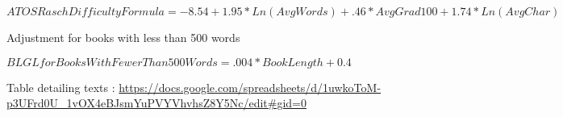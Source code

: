 $ATOS Rasch Difficulty Formula = -8.54 + 1.95 * Ln(AvgWords) + .46 * AvgGrad100 + 1.74 * Ln(AvgChar)$

Adjustment for books with less than 500 words

$BLGL for Books With Fewer Than 500 Words = .004 * Book Length + 0.4$


Table detailing texts : \url{https://docs.google.com/spreadsheets/d/1uwkoToM-p3UFrd0U_1vOX4eBJsmYuPVYVhvhsZ8Y5Nc/edit#gid=0}





